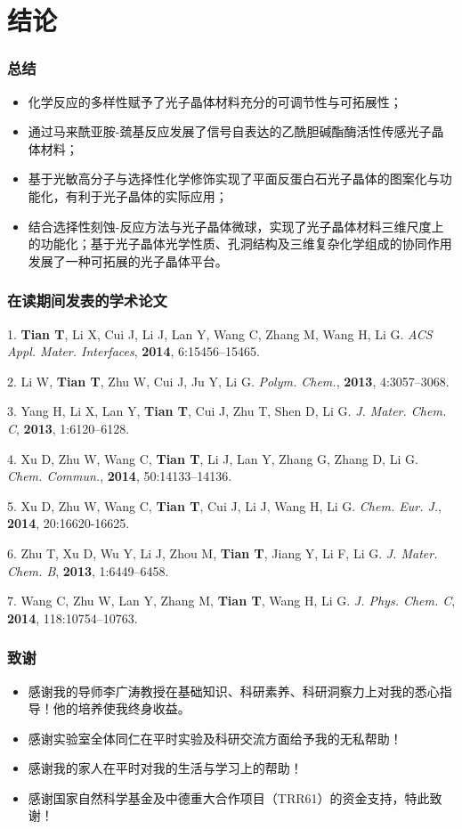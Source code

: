 \documentclass{beamer}
\begin{document}
\section{结论}
\begin{frame}
  \frametitle{总结}
  \begin{itemize}[<+-| alert@+>]
    \item
    化学反应的多样性赋予了光子晶体材料充分的可调节性与可拓展性；
    \item
    通过马来酰亚胺-巯基反应发展了信号自表达的乙酰胆碱酯酶活性传感光子晶体材料；
    \item
    基于光敏高分子与选择性化学修饰实现了平面反蛋白石光子晶体的图案化与功能化，有利于光子晶体的实际应用；
    \item
    结合选择性刻蚀-反应方法与光子晶体微球，实现了光子晶体材料三维尺度上的功能化；基于光子晶体光学性质、孔洞结构及三维复杂化学组成的协同作用发展了一种可拓展的光子晶体平台。
  \end{itemize}
\end{frame}

\begin{frame}
  \frametitle{在读期间发表的学术论文}
  {
  \scriptsize
  1. \textbf{Tian T}, Li X, Cui J, Li J, Lan Y, Wang C, Zhang M, Wang H, Li G. \textit{ACS Appl. Mater. Interfaces}, \textbf{2014}, 6:15456–15465. 
  
  2. Li W, \textbf{Tian T}, Zhu W, Cui J, Ju Y, Li G. \textit{Polym. Chem.}, \textbf{2013}, 4:3057–3068.
  
  3. Yang H, Li X, Lan Y, \textbf{Tian T}, Cui J, Zhu T, Shen D, Li G. \textit{J. Mater. Chem. C}, \textbf{2013}, 1:6120–6128.
  
  4. Xu D, Zhu W, Wang C, \textbf{Tian T}, Li J, Lan Y, Zhang G, Zhang D, Li G. \textit{Chem. Commun.}, \textbf{2014}, 50:14133–14136.
  
  5. Xu D, Zhu W, Wang C, \textbf{Tian T}, Cui J, Li J, Wang H, Li G. \textit{Chem. Eur. J.}, \textbf{2014}, 20:16620-16625.
  
  6. Zhu T, Xu D, Wu Y, Li J, Zhou M, \textbf{Tian T}, Jiang Y, Li F, Li G. \textit{J. Mater. Chem. B}, \textbf{2013}, 1:6449–6458.
  
  7. Wang C, Zhu W, Lan Y, Zhang M, \textbf{Tian T}, Wang H, Li G. \textit{J. Phys. Chem. C}, \textbf{2014}, 118:10754–10763.


  }
\end{frame}

\begin{frame}
  \frametitle{致谢}
  \begin{itemize}
    \item
    感谢我的导师李广涛教授在基础知识、科研素养、科研洞察力上对我的悉心指导！他的培养使我终身收益。
    \item
    感谢实验室全体同仁在平时实验及科研交流方面给予我的无私帮助！
    \item
    感谢我的家人在平时对我的生活与学习上的帮助！
    \item
    感谢国家自然科学基金及中德重大合作项目（TRR61）的资金支持，特此致谢！
  \end{itemize}
\end{frame}
\end{document}
